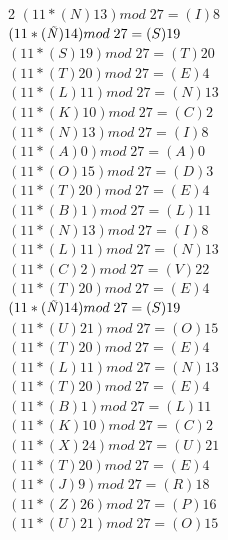 \documentclass{article}
\begin{document}
\begin{enumerate}
\begin{multicols}{2}
$(11 * (N)13) mod \; 27= (I)8 $\\
$(11 * (\text{\textit{Ñ}})14) mod \; 27= (S)19 $\\
$(11 * (S)19) mod \; 27= (T)20 $\\
$(11 * (T)20) mod \; 27= (E) 4 $\\
$(11 * (L)11) mod \; 27= (N)13 $\\
$(11 * (K)10) mod \; 27= (C)2 $\\
$(11 * (N)13) mod \; 27= (I)8 $\\
$(11 * (A)0) mod \; 27= (A)0 $\\
$(11 * (O)15) mod \; 27= (D)3 $\\
$(11 * (T)20) mod \; 27= (E) 4 $\\
$(11 * (B)1) mod \; 27= (L)11 $\\
$(11 * (N)13) mod \; 27= (I)8 $\\
$(11 * (L)11) mod \; 27= (N)13 $\\
$(11 * (C)2) mod \; 27= (V)22 $\\
$(11 * (T)20) mod \; 27= (E) 4 $\\
$(11 * (\text{\textit{Ñ}})14) mod \; 27= (S)19 $\\
$(11 * (U)21) mod \; 27= (O)15 $\\
$(11 * (T)20) mod \; 27= (E) 4 $\\
$(11 * (L)11) mod \; 27= (N)13 $\\
$(11 * (T)20) mod \; 27= (E) 4 $\\
$(11 * (B)1) mod \; 27= (L)11 $\\
$(11 * (K)10) mod \; 27= (C)2 $\\
$(11 * (X)24) mod \; 27= (U)21 $\\
$(11 * (T)20) mod \; 27= (E) 4 $\\
$(11 * (J)9) mod \; 27= (R)18 $\\
$(11 * (Z)26) mod \; 27= (P)16 $\\
$(11 * (U)21) mod \; 27= (O)15 $\\

\end{multicols}


\end{enumerate}
\end{document}
